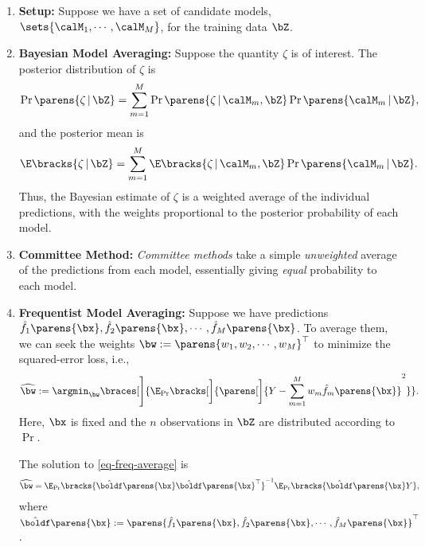 \documentclass[12pt]{article}
\begin{document}
\begin{enumerate}[label=\textbf{\arabic*.}]

	\item \textbf{Setup:} Suppose we have a set of candidate models, $\sets{\calM_1, \cdots, \calM_M}$, for the training data $\bZ$. 
	
	\item \textbf{Bayesian Model Averaging:} Suppose the quantity $\zeta$ is of interest. The posterior distribution of $\zeta$ is 
	\begin{align}
		\Pr \parens{\zeta \,\vert\, \bZ} = \sum_{m=1}^M \Pr \parens{\zeta \,\vert\, \calM_m, \bZ} \Pr \parens{\calM_m \,\vert\, \bZ}, 
	\end{align}
	and the posterior mean is 
	\begin{align}
		\E \bracks{\zeta \,\vert\, \bZ} = \sum_{m=1}^M \E \bracks{\zeta \,\vert\, \calM_m, \bZ} \Pr \parens{\calM_m \,\vert\, \bZ}. 
	\end{align}
	Thus, the Bayesian estimate of $\zeta$ is a weighted average of the individual predictions, with the weights proportional to the posterior probability of each model. 
	
	\item \textbf{Committee Method:} \emph{Committee methods} take a simple \emph{unweighted} average of the predictions from each model, essentially giving \emph{equal} probability to each model. 
	
	\item \textbf{Frequentist Model Averaging:} Suppose we have predictions $\hat{f}_1 \parens{\bx}, \hat{f}_2 \parens{\bx}, \cdots, \hat{f}_M \parens{\bx}$. To average them, we can seek the weights $\bw := \parens{w_1, w_2, \cdots, w_M}^\top$ to minimize the squared-error loss, i.e., 
	\begin{align}\label{eq-freq-average}
		\widehat{\bw} := \argmin_{\bw} \braces[\Bigg]{\E_{\Pr} \bracks[\bigg]{ \parens[\bigg]{Y - \sum_{m=1}^M w_m \hat{f}_{m} \parens{\bx}}^2}}. 
	\end{align}
	Here, $\bx$ is fixed and the $n$ observations in $\bZ$ are distributed according to $\Pr$. 
	
	The solution to \eqref{eq-freq-average} is 
	\begin{align}
		\widehat{\bw} = \E_{\Pr} \bracks{\hat{\boldf} \parens{\bx} \hat{\boldf} \parens{\bx}^\top}^{-1} \E_{\Pr} \bracks{\hat{\boldf} \parens{\bx} Y}, 
	\end{align}
	where $\hat{\boldf} \parens{\bx} := \parens{\hat{f}_1 \parens{\bx}, \hat{f}_2 \parens{\bx}, \cdots, \hat{f}_M \parens{\bx}}^\top$. 
	

\end{enumerate}
\end{document}
